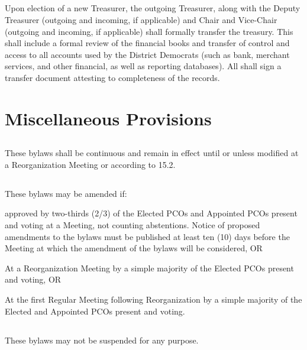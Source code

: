 \subsection{}
Upon election of a new Treasurer, the outgoing Treasurer, along with the Deputy Treasurer (outgoing and incoming, if applicable) and Chair and Vice-Chair (outgoing and incoming, if applicable) shall formally transfer the treasury. This shall include a formal review of the financial books and transfer of control and access to all accounts used by the \fortythird{} District Democrats (such as bank, merchant services, and other financial, as well as reporting databases). All shall sign a transfer document attesting to completeness of the records.

\section{Miscellaneous Provisions}
\subsection{}
These bylaws shall be continuous and remain in effect until or unless modified at a Reorganization Meeting or according to 15.2.

\subsection{}
These bylaws may be amended if:
\begin{inlinealphalist}
    \item approved by two-thirds (2/3) of the Elected PCOs and Appointed PCOs present and voting at a Meeting, not counting abstentions. Notice of proposed amendments to the bylaws must be published at least ten (10) days before the Meeting at which the amendment of the bylaws will be considered, OR
    \item At a Reorganization Meeting by a simple majority of the Elected PCOs present and voting, OR
    \item At the first Regular Meeting following Reorganization by a simple majority of the Elected and Appointed PCOs present and voting.
\end{inlinealphalist}

\subsection{}
These bylaws may not be suspended for any purpose.

